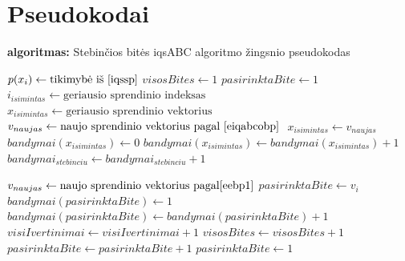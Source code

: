 \documentclass{VUMIFKompMagistrinis}
\begin{document}
\section{Pseudokodai}\label{PR5pseudo}


\begin{algorithm}[H]
\caption{\textbf{algoritmas:} Stebinčios bitės iqsABC algoritmo žingsnio pseudokodas}
\begin{spacing}{1.0}
\begin{algorithmic}[1]
        \State $p(x_i) \gets \text{tikimybė iš \eqref{iqssp}}$
    \EndFor
    \State $visosBites \gets 1$
    \State $pasirinktaBite \gets 1$
                \State $i_{isimintas} \gets \text{geriausio sprendinio indeksas} $
                \State $x_{isimintas} \gets  \text{geriausio sprendinio vektorius} $
                \State $v_{naujas} \gets \text{naujo sprendinio vektorius pagal \eqref{eiqabcobp} } $
                    \State $x_{isimintas} \gets v_{naujas}$
                    \State $bandymai(x_{isimintas}) \gets 0$
                \Else
                    \State $bandymai(x_{isimintas}) \gets bandymai(x_{isimintas})+1$
                    \State $bandymai_{stebinciu} \gets bandymai_{stebinciu}+1$
                \EndIf
                

            \Else      
                \State $v_{naujas} \gets \text{naujo sprendinio vektorius pagal} \eqref{eebp1}$
                    \State $pasirinktaBite \gets v_{i} $
                    \State $bandymai(pasirinktaBite) \gets 1$
                \Else
                    \State $bandymai(pasirinktaBite) \gets bandymai(pasirinktaBite)+1$
                \EndIf
            \EndIf
        \State $visiIvertinimai \gets visiIvertinimai + 1$
        \State $visosBites \gets visosBites + 1$
        \EndIf
        \State $pasirinktaBite \gets pasirinktaBite+1$
            \State $pasirinktaBite \gets 1$
        \EndIf
    \EndWhile
\end{algorithmic}
\end{spacing}
\label{alg:1}
\end{algorithm}
\end{document}
